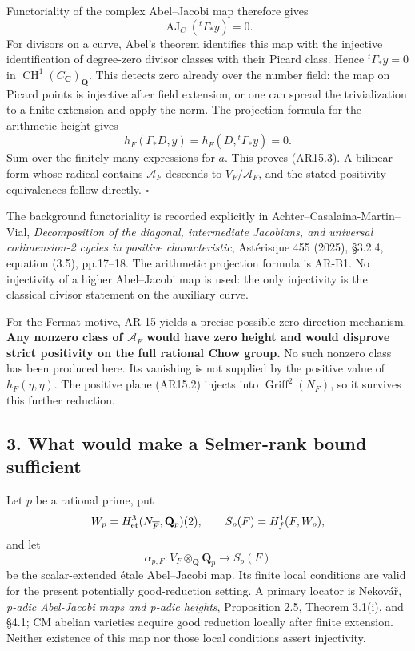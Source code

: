 Functoriality of the complex Abel--Jacobi map therefore gives \[
\operatorname{AJ}_C({}^t\Gamma_*y)=0.
\] For divisors on a curve, Abel's theorem identifies this map with the
injective identification of degree-zero divisor classes with their
Picard class. Hence \({}^t\Gamma_*y=0\) in
\(\operatorname{CH}^1(C_{\mathbf C})_{\mathbf Q}\). This detects zero
already over the number field: the map on Picard points is injective
after field extension, or one can spread the trivialization to a finite
extension and apply the norm. The projection formula for the arithmetic
height gives \[
h_F(\Gamma_*D,y)=h_F(D,{}^t\Gamma_*y)=0.
\] Sum over the finitely many expressions for \(a\). This proves
(AR15.3). A bilinear form whose radical contains \(\mathcal A_F\)
descends to \(V_F/\mathcal A_F\), and the stated positivity equivalences
follow directly. \(\square\)

The background functoriality is recorded explicitly in
Achter--Casalaina-Martin--Vial, \emph{Decomposition of the diagonal,
intermediate Jacobians, and universal codimension-2 cycles in positive
characteristic}, Astérisque 455 (2025), §3.2.4, equation (3.5),
pp.17--18. The arithmetic projection formula is AR-B1. No injectivity of
a higher Abel--Jacobi map is used: the only injectivity is the classical
divisor statement on the auxiliary curve.

For the Fermat motive, AR-15 yields a precise possible zero-direction
mechanism. \textbf{Any nonzero class of \(\mathcal A_F\) would have zero
height and would disprove strict positivity on the full rational Chow
group.} No such nonzero class has been produced here. Its vanishing is
not supplied by the positive value of \(h_F(\eta,\eta)\). The positive
plane (AR15.2) injects into \(\operatorname{Griff}^2(N_F)\), so it
survives this further reduction.

\subsection{3. What would make a Selmer-rank bound
sufficient}\label{what-would-make-a-selmer-rank-bound-sufficient}

Let \(p\) be a rational prime, put \[
W_p=H^3_{\rm et}(N_{\overline F},\mathbf Q_p)(2),
\qquad S_p(F)=H^1_f(F,W_p),
\] and let \[
\alpha_{p,F}:V_F\otimes_{\mathbf Q}\mathbf Q_p
             \longrightarrow S_p(F)
\tag{AR16.1}
\] be the scalar-extended étale Abel--Jacobi map. Its finite local
conditions are valid for the present potentially good-reduction setting.
A primary locator is Nekovář, \emph{p-adic Abel-Jacobi maps and p-adic
heights}, Proposition 2.5, Theorem 3.1(i), and §4.1; CM abelian
varieties acquire good reduction locally after finite extension. Neither
existence of this map nor those local conditions assert injectivity.

